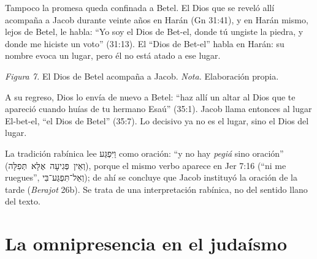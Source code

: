 \documentclass[11pt,letterpaper]{article}
\newcommand{\heb}[1]{\mbox{\foreignlanguage{hebrew}{#1}}}
\begin{document}
Tampoco la promesa queda confinada a Betel. El Dios que se reveló allí acompaña a Jacob durante veinte años en Harán (Gn 31:41), y en Harán mismo, lejos de Betel, le habla: ``Yo soy el Dios de Bet-el, donde tú ungiste la piedra, y donde me hiciste un voto'' (31:13). El ``Dios de Bet-el'' habla en Harán: su nombre evoca un lugar, pero él no está atado a ese lugar.

\begin{center}
\par
{\footnotesize\color{gris}\textit{Figura 7.} El Dios de Betel acompaña a Jacob. \textit{Nota.} Elaboración propia.}
\end{center}

A su regreso, Dios lo envía de nuevo a Betel: ``haz allí un altar al Dios que te apareció cuando huías de tu hermano Esaú'' (35:1). Jacob llama entonces al lugar El-bet-el, ``el Dios de Betel'' (35:7). Lo decisivo ya no es el lugar, sino el Dios del lugar.

\begin{nota}[Precisión]
La tradición rabínica lee \heb{וַיִּפְגַּע} como oración: ``y no hay \emph{pegiá} sino oración'' (\heb{וְאֵין פְּגִיעָה אֶלָּא תְּפִלָּה}), porque el mismo verbo aparece en Jer 7:16 (``ni me ruegues'', \heb{וְאַל־תִּפְגַּע־בִּי}); de ahí se concluye que Jacob instituyó la oración de la tarde (\emph{Berajot} 26b). Se trata de una interpretación rabínica, no del sentido llano del texto.
\end{nota}

\section{La omnipresencia en el judaísmo}\label{sec:judaismo-omni}
\end{document}
